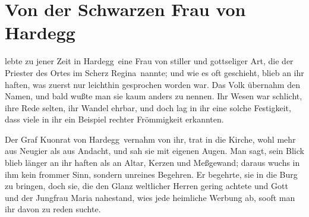 
\section{Von der Schwarzen Frau von Hardegg}

 lebte zu jener Zeit in \gls{Hardegg}\ eine Frau von stiller und gottseliger Art, die der Priester des Ortes im Scherz \gls{Regina}\ nannte; und wie es oft geschieht, blieb an ihr haften, was zuerst nur leichthin gesprochen worden war. Das Volk übernahm den Namen, und bald wußte man sie kaum anders zu nennen. Ihr Wesen war schlicht, ihre Rede selten, ihr Wandel ehrbar, und doch lag in ihr eine solche Festigkeit, dass viele in ihr ein Beispiel rechter Frömmigkeit erkannten.

Der Graf \gls{Kuonrat von Hardegg}\ vernahm von ihr, trat in die Kirche, wohl mehr aus Neugier als aus Andacht, und sah sie mit eigenen Augen. Man sagt, sein Blick blieb länger an ihr haften als an Altar, Kerzen und Meßgewand; daraus wuchs in ihm kein frommer Sinn, sondern unreines Begehren. Er begehrte, sie in die Burg zu bringen, doch sie, die den Glanz weltlicher Herren gering achtete und Gott und der Jungfrau Maria nahestand, wies jede heimliche Werbung ab, sooft man ihr davon zu reden suchte.


